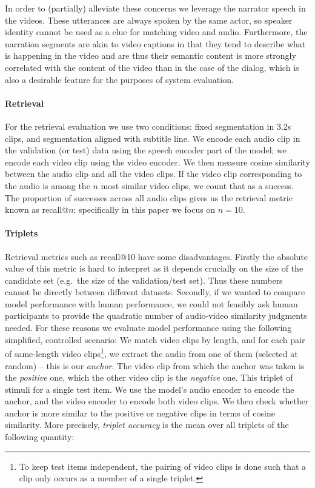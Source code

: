 In order to (partially) alleviate these concerns we leverage the
narrator speech in the videos. These utterances are always spoken by
the same actor, so speaker identity cannot be used as a clue for
matching video and audio. Furthermore, the narration segments are akin
to video captions in that they tend to describe what is happening in
the video and are thus their semantic content is more strongly
correlated with the content of the video than in the case of the
dialog, which is also a desirable feature for the purposes of system
evaluation.

\paragraph{Retrieval}
For the retrieval evaluation we use two conditions: fixed segmentation
in 3.2s clips, and segmentation aligned with subtitle line. We encode
each audio clip in the validation (or test) data using the speech
encoder part of the model; we encode each video clip using the video
encoder. We then measure cosine similarity between the audio clip and
all the video clips. If the video clip corresponding to the audio is
among the $n$ most similar video clips, we count that as a
success. The proportion of successes across all audio clips gives us
the retrieval metric known as recall@$n$: specifically in this paper we
focus on $n=10$.

\paragraph{Triplets}
Retrieval metrics such as recall@10 have some disadvantages. Firstly
the absolute value of this metric is hard to interpret as it depends
crucially on the size of the candidate set (e.g.\ the size of the
validation/test set). Thus these numbers cannot be directly between
different datasets. Secondly, if we wanted to compare model
performance with human performance, we could not feasibly ask human
participants to provide the quadratic number of audio-video similarity
judgments needed. For these reasons we evaluate model performance
using the following simplified, controlled scenario: We match video
clips by length, and for each pair of same-length video
clips\footnote{To keep test items independent, the pairing of video
  clips is done such that a clip only occurs as a member of a single
  triplet.}, we extract the audio from one of them (selected at
random) -- this is our {\it anchor}. The video clip from which the
anchor was taken is the {\it positive} one, which the other video clip
is the {\it negative} one. This triplet of stimuli for a single test
item.  We use the model's audio encoder to encode the anchor, and the
video encoder to encode both video clips. We then check whether anchor
is more similar to the positive or negative clips in terms of cosine
similarity.  More precisely, {\it triplet accuracy} is the mean over
all triplets of the following quantity:

